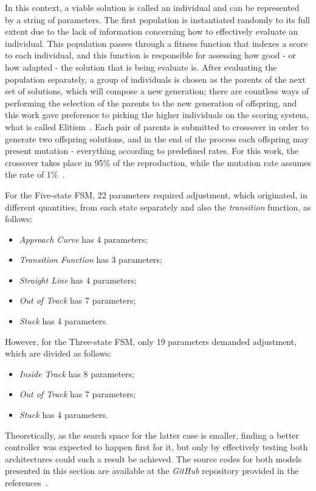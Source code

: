 	In this context, a viable solution is called an individual and can be represented by a string of parameters. The first population is instantiated randomly to its full extent due to the lack of information concerning how to effectively evaluate an individual. This population passes through a fitness function that indexes a score to each individual, and this function is responsible for assessing how good - or how adapted - the solution that is being evaluate is. After evaluating the population separately, a group of individuals is chosen as the parents of the next set of solutions, which will compose a new generation; there are countless ways of performing the selection of the parents to the new generation of offspring, and this work gave preference to picking the higher individuals on the scoring system, what is called Elitism~\cite{ELITISM}. Each pair of parents is submitted to crossover in order to generate two offspring solutions, and in the end of the process each offspring may present mutation - everything according to predefined rates. For this work, the crossover takes place in 95\% of the reproduction, while the mutation rate assumes the rate of 1\%~\cite{RATES}.
	
	For the Five-state FSM, 22 parameters required adjustment, which originated, in different quantities, from each state separately and also the \emph{transition} function, as follows:
	
	\begin{itemize}
		
		\item \emph{Approach Curve} has 4 parameters;
		
		\item \emph{Transition Function} has 3 parameters;
		
		\item \emph{Straight Line} has 4 parameters;
		
		\item \emph{Out of Track} has 7 parameters;
		
		\item \emph{Stuck} has 4 parameters.
		
	\end{itemize}
	
	However, for the Three-state FSM, only 19 parameters demanded adjustment, which are divided as follows:
	
	\begin{itemize}
		
		\item \emph{Inside Track} has 8 parameters;
		
		\item \emph{Out of Track} has 7 parameters;
		
		\item \emph{Stuck} has 4 parameters.
		
	\end{itemize}
	
	Theoretically, as the search space for the latter case is smaller, finding a better controller was expected to happen first for it, but only by effectively testing both architectures could such a result be achieved. The source codes for both models presented in this section are available at the \emph{GitHub} repository provided in the references~\cite{GitHub}.
	